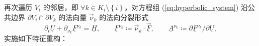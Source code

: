 再次遍历 $V_{i}$ 的邻居，即 $\forall k\in K_{i}\setminus\left\{ i\right\} $，对方程组
(\ref{eq:hyperbolic_system}) 沿公共边界 $\partial V_{i}\cap\partial V_{k}$
的法向量
$\vec{\nu}_{k}$ 的法向分裂形式
\begin{equation}
\partial_{t}\underline{U}+\partial_{\nu_{k}}\underline{F}^{\nu_{k}}=\underline{H},\qquad\underline{F}^{\nu_{k}}\coloneqq\vec{\nu}_{k}\cdot\vec{\underline{F}},\qquad\underline{A}^{\nu_{k}}\coloneqq\partial\underline{F}^{\nu_{k}}/\partial\underline{U},
\end{equation}
实施如下特征重构：
